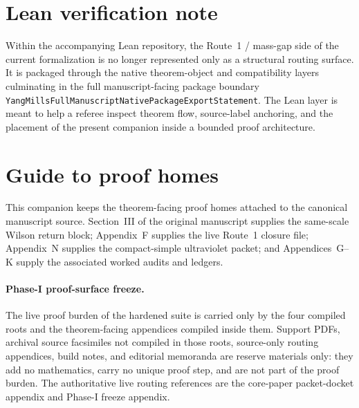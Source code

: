 \documentclass[preprint,aip,jmp,amsmath,amssymb,nofootinbib]{revtex4-2}
\begin{document}
\begin{abstract}
This companion is the proof home for the ultraviolet/public-scope gate and the Route~1 mass-gap chain. It is assembled directly from the canonical March~16,~2026 LaTeX source tree. The document preserves the theorem-facing routing used by the core paper and incorporates the authoritative same-scale Wilson return block, the live Route~1 closure file, the compact-simple ultraviolet packet, and the associated worked audits and ledgers from the canonical source. The accompanying Lean repository supplies a checkable manuscript-facing route map for this mass-gap chain within the full proof architecture.
\end{abstract}
\maketitle
\section*{Lean verification note}
Within the accompanying Lean repository, the Route~1 / mass-gap side of the
current formalization is no longer represented only as a structural routing
surface. It is packaged through the native theorem-object and compatibility
layers culminating in the full manuscript-facing package boundary
\texttt{YangMillsFullManuscriptNativePackageExportStatement}. The Lean layer is
meant to help a referee inspect theorem flow, source-label anchoring, and the
placement of the present companion inside a bounded proof architecture.
\section*{Guide to proof homes}
This companion keeps the theorem-facing proof homes attached to the canonical manuscript source. Section~III of the original manuscript supplies the same-scale Wilson return block; Appendix~F supplies the live Route~1 closure file; Appendix~N supplies the compact-simple ultraviolet packet; and Appendices~G--K supply the associated worked audits and ledgers.

\paragraph{Phase-I proof-surface freeze.}
The live proof burden of the hardened suite is carried only by the four compiled roots and the theorem-facing appendices compiled inside them. Support PDFs, archival source facsimiles not compiled in those roots, source-only routing appendices, build notes, and editorial memoranda are reserve materials only: they add no mathematics, carry no unique proof step, and are not part of the proof burden. The authoritative live routing references are the core-paper packet-docket appendix and Phase-I freeze appendix.
\end{document}

